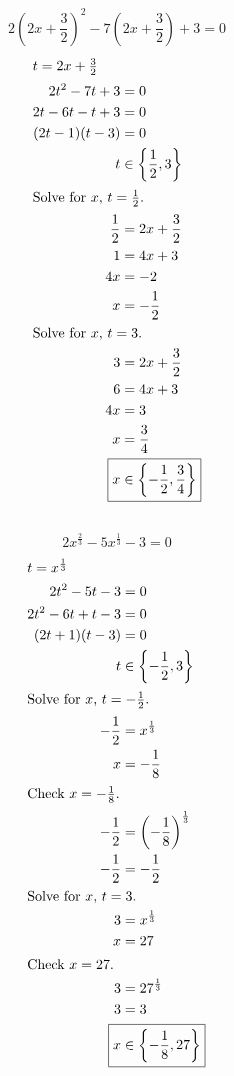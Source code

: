 	\subsection{}
		\[2{\left(2x + \frac{3}{2}\right)}^2 - 7\left(2x + \frac{3}{2}\right) + 3 = 0\]
		\begin{align*}
			\intertext{$t = 2x + \frac{3}{2}$}
			2t^2 - 7t + 3 &= 0 \\
			2t - 6t - t + 3 &= 0 \\
			(2t - 1)(t - 3) &= 0 \\
			t &\in \left\{\frac{1}{2}, 3\right\} \\
			\intertext{Solve for $x$, $t = \frac{1}{2}$.}
			\frac{1}{2} &= 2x + \frac{3}{2} \\
			1 &= 4x + 3 \\
			4x &= -2 \\
			x &= -\frac{1}{2} \\
			\intertext{Solve for $x$, $t = 3$.}
			3 &= 2x + \frac{3}{2} \\
			6 &= 4x + 3 \\
			4x &= 3 \\
			x &= \frac{3}{4} \\
			\Aboxed{x &\in \left\{-\frac{1}{2}, \frac{3}{4}\right\}}
		\end{align*}
		\pagebreak{}

	\subsection{}
		\[2x^{\frac{2}{3}} - 5x^{\frac{1}{3}} - 3 = 0\]
		\begin{align*}
			\intertext{$t = x^{\frac{1}{3}}$}
			2t^2 - 5t - 3 &= 0 \\
			2t^2 - 6t + t - 3 &= 0 \\
			(2t + 1)(t - 3) &= 0 \\
			t &\in \left\{-\frac{1}{2}, 3\right\} \\
			\intertext{Solve for $x$, $t = -\frac{1}{2}$.}
			-\frac{1}{2} &= x^{\frac{1}{3}} \\
			x &= -\frac{1}{8} \\
			\intertext{Check $x = -\frac{1}{8}$.}
			-\frac{1}{2} &= {\left(-\frac{1}{8}\right)}^{\frac{1}{3}} \\
			-\frac{1}{2} &= -\frac{1}{2} \\
			\intertext{Solve for $x$, $t = 3$.}
			3 &= x^{\frac{1}{3}} \\
			x &= 27 \\
			\intertext{Check $x = 27$.}
			3 &= 27^{\frac{1}{3}} \\
			3 &= 3 \\
			\Aboxed{x &\in \left\{-\frac{1}{8}, 27\right\}}
		\end{align*}
		\pagebreak{}

